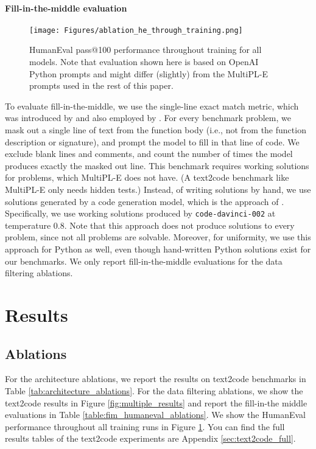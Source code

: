 \documentclass[10pt]{article} \usepackage{iclr2023_conference,times}
\begin{document}
\paragraph{Fill-in-the-middle evaluation}
\begin{figure}
    \centering
    \texttt{[image: Figures/ablation\_he\_through\_training.png]}
    \caption{HumanEval pass@100 performance throughout training for all models. Note that evaluation shown here is based on OpenAI Python prompts and might differ (slightly) from the MultiPL-E prompts used in the rest of this paper.}
    \label{fig:human_eval_training}
\end{figure}
To evaluate fill-in-the-middle, we use the single-line exact match metric, which was introduced by \citet{fried2022incoder} and also employed by \citet{bavarian2022fim}.
For every benchmark problem, we mask out a single line of text from the function body (i.e., not from the function description or signature), and prompt the model to fill in that line of code. We exclude blank lines and comments, and count the number of times the model produces exactly the masked out line.
This benchmark requires working solutions for problems, which MultiPL-E does not have. (A text2code benchmark like MultiPL-E only needs hidden tests.) Instead, of writing solutions by hand, we use solutions generated by a code generation model, which is the approach of \citet{mbxp}. Specifically, we use working solutions produced by \texttt{code-davinci-002} at temperature 0.8. Note that this approach does not produce solutions to every problem, since not all problems are solvable. Moreover, for uniformity, we use this approach for Python as well, even though hand-written Python solutions exist for our benchmarks. We only report fill-in-the-middle evaluations for the data filtering ablations. 

\section{Results}

\subsection{Ablations}
For the architecture ablations, we report the results on text2code benchmarks in Table \ref{tab:architecture_ablations}. For the data filtering ablations, we show the text2code results in Figure \ref{fig:multiple_results} and report the fill-in-the middle evaluations in Table \ref{table:fim_humaneval_ablations}.  We show the HumanEval performance throughout all training runs in Figure \ref{fig:human_eval_training}. You can find the full results tables of the text2code experiments are Appendix \ref{sec:text2code_full}. 
\end{document}
